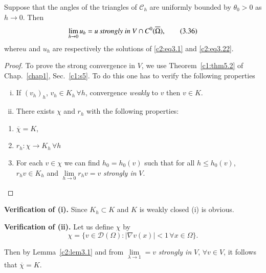  \begin{theorem}\label{c2:thm3.3}%
Suppose that the angles of the triangles of $\mathscr{C}_h$ are
uniformly bounded by $\theta _0  > 0$ as $h \to 0$. Then  
\begin{equation}
\lim_{h \to 0} u_h = u ~\text{\em strongly in } V \cap C^0
(\overline{\Omega}), \tag{3.36}\label{c2:3.36}  
\end{equation}
where\pageoriginale  $u$ and $u_h$ are respectively the solutions of \eqref{c2:eq3.1} and
\eqref{c2:eq3.22}. 
\end{theorem} 
 
\begin{proof}
To prove the strong convergence in $V$, we use Theorem~\ref{c1:thm5.2}
of Chap.~\ref{chap1}, Sec.~\ref{c1:s5}. To do this one has to verify
the following properties  
\begin{enumerate}[(i)]
\item If $(v_h)_h$, $v_h \in K_h\, \forall  h$, convergence
  \textit{weakly} to $v$ then $v \in K$. 
\item There exists $\chi$ and $r_h$ with the following properties: 
\end{enumerate}
\begin{enumerate}[(1)]
 \item $\overline{\chi} = K$,
 \item $r_h : \chi \to K_h\, \forall  h$
 \item For each $v \in \chi$ we can find $h_0 = h_0 (v)$ such
   that for all $h \leq h_0 (v)$, $r_h v \in K_h$ and
   $\lim\limits_{h \to 0} r_h v = v $ \textit{\em strongly in}  $V$.  
\end{enumerate}
\end{proof} 

\medskip 
\noindent 
\textbf{Verification of (i). }%
Since $K_h \subset K$ and $K$ is weakly closed (i) is obvious. 
 
\medskip 
\noindent 
\textbf{Verification of (ii). }%
Let us define $\chi$ by
$$
\chi = \{v \in \mathscr{D}(\Omega) : | \nabla v(x) | <
1\, \forall  x \in \Omega \}. 
$$ 
 
 Then by Lemma~\ref{c2:lem3.1} and from $\lim\limits_{\lambda \to 1} = v$
 \textit{strongly in }$V$, $\forall v \in V$, it follows that
 $\overline{\chi} = K$. 
 
